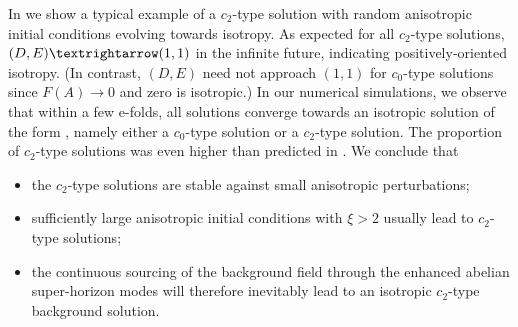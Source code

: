 In  we show a typical example of a $c_{2}$\nobreakdash-type solution with random anisotropic initial conditions evolving towards isotropy. As expected for all $c_{2}$\nobreakdash-type solutions, $(D,E)\textrightarrow(1,1)$ in the infinite future, indicating positively-oriented isotropy. (In contrast, $(D,E)$ need not approach $(1,1)$ for $c_{0}$\nobreakdash-type solutions since $F(A)\to0$ and zero is isotropic.) In our numerical simulations, we observe that within a few e-folds, all solutions converge towards an isotropic solution of the form , namely either a $c_{0}$\nobreakdash-type solution or a $c_{2}$\nobreakdash-type solution. The proportion of $c_{2}$\nobreakdash-type solutions was even higher than predicted in . We conclude that 
\begin{itemize}
\item the $c_{2}$\nobreakdash-type solutions are stable against small anisotropic perturbations; 
\item sufficiently large anisotropic initial conditions with $\xi>2$ usually lead to $c_{2}$\nobreakdash-type solutions; 
\item the continuous sourcing of the background field through the enhanced abelian super-horizon modes will therefore inevitably lead to an isotropic $c_{2}$\nobreakdash-type background solution. 
\end{itemize}

